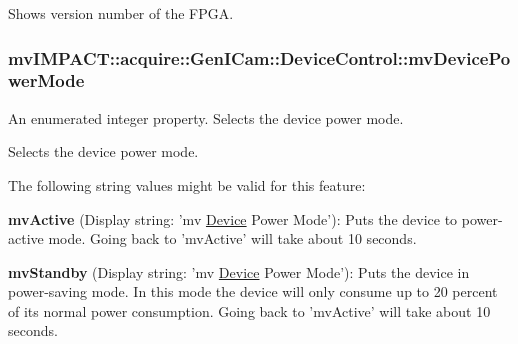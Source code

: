 Shows version number of the F\+P\+G\+A. \hypertarget{classmv_i_m_p_a_c_t_1_1acquire_1_1_gen_i_cam_1_1_device_control_a373e023dc2b65b6df34216eeffb895ec}{
\subsubsection[{mv\+Device\+Power\+Mode}]{ mv\+I\+M\+P\+A\+C\+T\+::acquire\+::\+Gen\+I\+Cam\+::\+Device\+Control\+::mv\+Device\+Power\+Mode}}\label{classmv_i_m_p_a_c_t_1_1acquire_1_1_gen_i_cam_1_1_device_control_a373e023dc2b65b6df34216eeffb895ec}


An enumerated integer property. Selects the device power mode. 

Selects the device power mode.

The following string values might be valid for this feature\+:
\begin{DoxyItemize}
\item {\bfseries mv\+Active} (Display string\+: 'mv \hyperlink{classmv_i_m_p_a_c_t_1_1acquire_1_1_device}{Device} Power Mode')\+: Puts the device to power-\/active mode. Going back to 'mv\+Active' will take about 10 seconds.
\item {\bfseries mv\+Standby} (Display string\+: 'mv \hyperlink{classmv_i_m_p_a_c_t_1_1acquire_1_1_device}{Device} Power Mode')\+: Puts the device in power-\/saving mode. In this mode the device will only consume up to 20 percent of its normal power consumption. Going back to 'mv\+Active' will take about 10 seconds.
\end{DoxyItemize}

